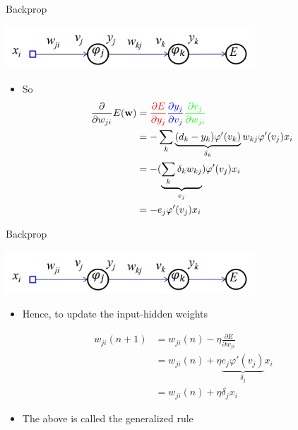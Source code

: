 \documentclass[notes]{beamer}
\providecommand{\tightlist}{%
  \setlength{\itemsep}{0pt}\setlength{\parskip}{0pt}}
\begin{document}
\begin{frame}{Backprop}

\centering 

\includegraphics[width=0.70000\textwidth]{2018-03-10-13-49-42.png}\\

\begin{itemize}
\tightlist
\item
  So\\

  \begin{align}
  \frac{\partial }{\partial w_{ji}} E(\mathbf{w}) &= 
    \textcolor{red}{
        \frac{\partial E}{\partial y_j}} 
    \textcolor{blue}{
        \frac{\partial y_j}{\partial v_j}
    } 
    \textcolor{green}{
        \frac{\partial v_j}{\partial w_{ji}}
    } \\
    &=  - \sum_{k} \underbrace{(d_k - y_k) \varphi ' (v_k) }_{\delta_k} w_{kj} \varphi ' (v_j) x_i  \\
    & = -(\underbrace{\sum_k \delta_k w_{kj}}_{e_j}) \varphi ' (v_j) x_i \\ 
    &= -e_j \varphi ' (v_j )x_i
  \end{align}
\end{itemize}

\end{frame}

\begin{frame}{Backprop}

\centering 

\includegraphics[width=0.70000\textwidth]{2018-03-10-13-49-42.png}\\

\begin{itemize}
\tightlist
\item
  Hence, to update the input-hidden weights
\end{itemize}

\begin{align}
    w_{ji} (n+1 ) & = w_{ji} (n) - \eta \frac{\partial E}{\partial w_{ji}} \\
    &= w_{ji} (n) + \eta \underbrace{ e_j \varphi ' (v_j)  }_{\delta_j} x_i  \\ 
    &= w_{ji}(n) + \eta \delta_j x_i   
\end{align}

\begin{itemize}
\tightlist
\item
  The above is called the generalized rule
\end{itemize}

\end{frame}
\end{document}
